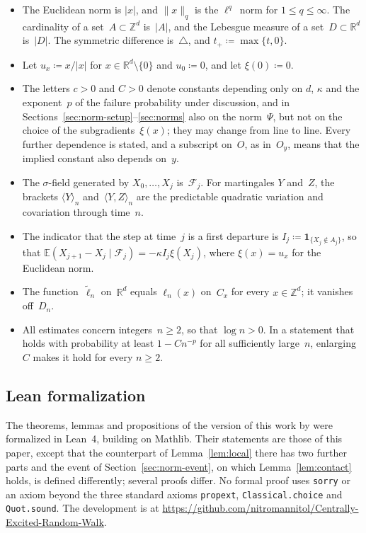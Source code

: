 \documentclass[11pt]{amsart}
\theoremstyle{plain}
\theoremstyle{definition}
\newcommand{\Z}{\mathbb Z}
\newcommand{\R}{\mathbb R}
\newcommand{\E}{\mathbb E}
\newcommand{\drift}{\kappa}
\newcommand{\gauge}{\Psi}
\newcommand{\ind}{\mathbf 1}
\numberwithin{equation}{section}
\begin{document}
\begin{itemize}
\item The Euclidean norm is $|x|$, and $\|x\|_q$ is the $\ell^q$~norm for $1\leq q\leq\infty$. The cardinality of a set~$A\subset\Z^d$ is~$|A|$, and the Lebesgue measure of a set~$D\subset\R^d$ is~$|D|$. The symmetric difference is~$\triangle$, and $t_+\coloneqq\max\{t,0\}$.
\item Let $u_x\coloneqq x/|x|$ for $x\in\R^d\setminus\{0\}$ and $u_0\coloneqq0$, and let $\xi(0)\coloneqq0$.
\item The letters $c>0$ and $C>0$ denote constants depending only on $d$, $\drift$ and the exponent~$p$ of the failure probability under discussion, and in Sections~\ref{sec:norm-setup}--\ref{sec:norms} also on the norm~$\gauge$, but not on the choice of the subgradients~$\xi(x)$; they may change from line to line. Every further dependence is stated, and a subscript on~$O$, as in~$O_y$, means that the implied constant also depends on~$y$.
\item The $\sigma$-field generated by $X_0,\ldots,X_j$ is~$\mathcal F_j$. For martingales $Y$ and~$Z$, the brackets $\langle Y\rangle_n$ and~$\langle Y,Z\rangle_n$ are the predictable quadratic variation and covariation through time~$n$.
\item The indicator that the step at time~$j$ is a first departure is $I_j\coloneqq\ind_{\{X_j\notin A_j\}}$, so that $\E(X_{j+1}-X_j\mid\mathcal F_j)=-\drift I_j\xi(X_j)$, where $\xi(x)=u_x$ for the Euclidean norm.
\item The function~$\widetilde\ell_n$ on~$\R^d$ equals $\ell_n(x)$ on~$C_x$ for every $x\in\Z^d$; it vanishes off~$D_n$.
\item All estimates concern integers~$n\geq2$, so that $\log n>0$. In a statement that holds with probability at least $1-Cn^{-p}$ for all sufficiently large~$n$, enlarging~$C$ makes it hold for every $n\geq2$.
\end{itemize}

\subsection{Lean formalization}\label{ssec:formalization}
The theorems, lemmas and propositions of the version of this work by \citet{BouRabeePeres2026CERW} were formalized in Lean~4, building on Mathlib. Their statements are those of this paper, except that the counterpart of Lemma~\ref{lem:local} there has two further parts and the event of Section~\ref{sec:norm-event}, on which Lemma~\ref{lem:contact} holds, is defined differently; several proofs differ. No formal proof uses \texttt{sorry} or an axiom beyond the three standard axioms \texttt{propext}, \texttt{Classical.choice} and \texttt{Quot.sound}. The development is at \url{https://github.com/nitromannitol/Centrally-Excited-Random-Walk}.
\end{document}
